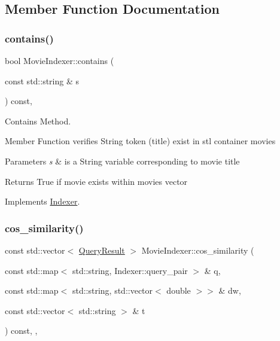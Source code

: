 \subsection{Member Function Documentation}
\mbox{\label{class_movie_indexer_a94c19bb7518b7d219cc88bab1a507030}} 
\subsubsection{\texorpdfstring{contains()}{contains()}}
{\footnotesize\ttfamily bool Movie\+Indexer\+::contains (\begin{DoxyParamCaption}\item[{const std\+::string \&}]{s }\end{DoxyParamCaption}) const\hspace{0.3cm}{\ttfamily [override]}, {\ttfamily [virtual]}}



Contains Method. 

Member Function verifies String token (title) exist in stl container movies


\begin{DoxyParams}{Parameters}
{\em s} & is a String variable corresponding to movie title \\
\hline
\end{DoxyParams}
\begin{DoxyReturn}{Returns}
True if movie exists within movies vector 
\end{DoxyReturn}


Implements \hyperlink{class_indexer_abb847ff86be1ec9265fb53a5ac6f7008}{Indexer}.

\mbox{\label{class_movie_indexer_a2e09c1755d3d5b0fa6f238352d1850a7}} 
\subsubsection{\texorpdfstring{cos\+\_\+similarity()}{cos\_similarity()}}
{\footnotesize\ttfamily const std\+::vector$<$ \hyperlink{class_query_result}{Query\+Result} $>$ Movie\+Indexer\+::cos\+\_\+similarity (\begin{DoxyParamCaption}\item[{const std\+::map$<$ std\+::string, Indexer\+::query\+\_\+pair $>$ \&}]{q,  }\item[{const std\+::map$<$ std\+::string, std\+::vector$<$ double $>$$>$ \&}]{dw,  }\item[{const std\+::vector$<$ std\+::string $>$ \&}]{t }\end{DoxyParamCaption}) const\hspace{0.3cm}{\ttfamily [override]}, {\ttfamily [private]}, {\ttfamily [virtual]}}



